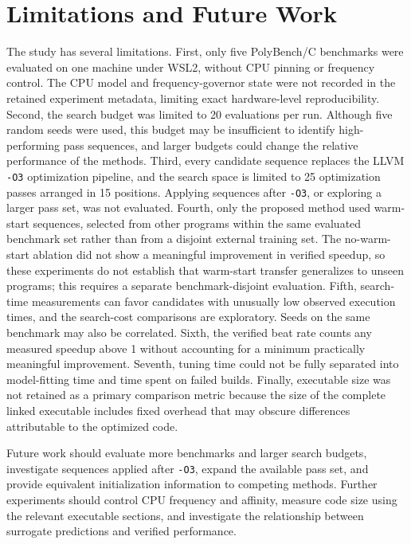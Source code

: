 

\section{Limitations and Future Work}
The study has several limitations. First, only five PolyBench/C benchmarks were evaluated on one machine under WSL2, without CPU pinning or frequency control. The CPU model and frequency-governor state were not recorded in the retained experiment metadata, limiting exact hardware-level reproducibility. Second, the search budget was limited to 20 evaluations per run. Although five random seeds were used, this budget may be insufficient to identify high-performing pass sequences, and larger budgets could change the relative performance of the methods. Third, every candidate sequence replaces the LLVM \texttt{-O3} optimization pipeline, and the search space is limited to 25 optimization passes arranged in 15 positions. Applying sequences after \texttt{-O3}, or exploring a larger pass set, was not evaluated. Fourth, only the proposed method used warm-start sequences, selected from other programs within the same evaluated benchmark set rather than from a disjoint external training set. The no-warm-start ablation did not show a meaningful improvement in verified speedup, so these experiments do not establish that warm-start transfer generalizes to unseen programs; this requires a separate benchmark-disjoint evaluation. Fifth, search-time measurements can favor candidates with unusually low observed execution times, and the search-cost comparisons are exploratory. Seeds on the same benchmark may also be correlated. Sixth, the verified beat rate counts any measured speedup above 1 without accounting for a minimum practically meaningful improvement. Seventh, tuning time could not be fully separated into model-fitting time and time spent on failed builds. Finally, executable size was not retained as a primary comparison metric because the size of the complete linked executable includes fixed overhead that may obscure differences attributable to the optimized code.

Future work should evaluate more benchmarks and larger search budgets, investigate sequences applied after \texttt{-O3}, expand the available pass set, and provide equivalent initialization information to competing methods. Further experiments should control CPU frequency and affinity, measure code size using the relevant executable sections, and investigate the relationship between surrogate predictions and verified performance.


